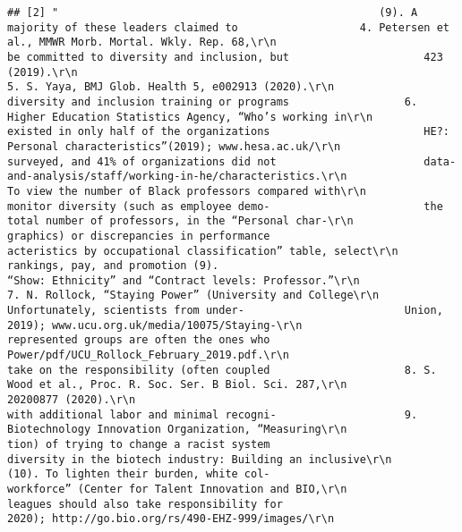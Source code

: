 \documentclass[
]{book}
\begin{document}
\begin{verbatim}
## [2] "                                                  (9). A majority of these leaders claimed to                   4. Petersen et al., MMWR Morb. Mortal. Wkly. Rep. 68,\r\n                                                  be committed to diversity and inclusion, but                     423 (2019).\r\n                                                                                                                5. S. Yaya, BMJ Glob. Health 5, e002913 (2020).\r\n                                                  diversity and inclusion training or programs                  6. Higher Education Statistics Agency, “Who’s working in\r\n                                                  existed in only half of the organizations                        HE?: Personal characteristics”(2019); www.hesa.ac.uk/\r\n                                                  surveyed, and 41% of organizations did not                       data-and-analysis/staff/working-in-he/characteristics.\r\n                                                                                                                   To view the number of Black professors compared with\r\n                                                  monitor diversity (such as employee demo-                        the total number of professors, in the “Personal char-\r\n                                                  graphics) or discrepancies in performance                        acteristics by occupational classification” table, select\r\n                                                  rankings, pay, and promotion (9).                                “Show: Ethnicity” and “Contract levels: Professor.”\r\n                                                                                                                7. N. Rollock, “Staying Power” (University and College\r\n                                                     Unfortunately, scientists from under-                         Union, 2019); www.ucu.org.uk/media/10075/Staying-\r\n                                                  represented groups are often the ones who                        Power/pdf/UCU_Rollock_February_2019.pdf.\r\n                                                  take on the responsibility (often coupled                     8. S. Wood et al., Proc. R. Soc. Ser. B Biol. Sci. 287,\r\n                                                                                                                   20200877 (2020).\r\n                                                  with additional labor and minimal recogni-                    9. Biotechnology Innovation Organization, “Measuring\r\n                                                  tion) of trying to change a racist system                        diversity in the biotech industry: Building an inclusive\r\n                                                  (10). To lighten their burden, white col-                        workforce” (Center for Talent Innovation and BIO,\r\n                                                  leagues should also take responsibility for                      2020); http://go.bio.org/rs/490-EHZ-999/images/\r\n                                                                                                                   
\end{verbatim}
\end{document}
